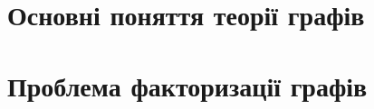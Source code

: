 \documentclass[a4paper,14pt,ukrainian]{extarticle}
\begin{document}


\tableofcontents
\newpage

\section{Основні поняття теорії графів}

\newpage

\section{Проблема факторизації графів}


\clearpage
{}


\end{document}
